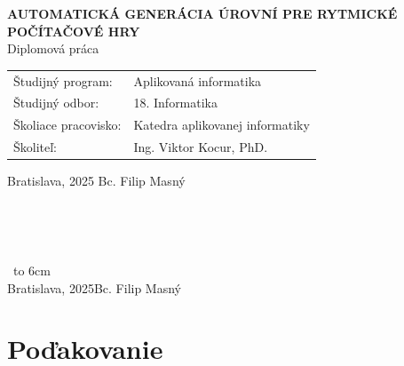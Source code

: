 \documentclass[12pt, oneside]{book}  %
\def\mftitle{Automatická Generácia Úrovní pre Rytmické Počítačové Hry}
\def\mfthesistype{Diplomová práca}
\def\mfauthor{Bc. Filip Masný}
\def\mfskolitel{Ing. Viktor Kocur, PhD.}
\def\mfplacedate{Bratislava, 2025}
\def\mfodbor{18. Informatika}
\def\program{Aplikovaná informatika}
\def\mfpracovisko{Katedra aplikovanej informatiky}
\begin{document}
\begin{center}
    \textbf{\MakeUppercase{\Large\mftitle}}\\
    \mfthesistype
\end{center}
\vfill


\begin{tabular}{l l}
    Študijný program:    & \program      \\
    Študijný odbor:      & \mfodbor      \\
    Školiace pracovisko: & \mfpracovisko \\
    Školiteľ:            & \mfskolitel   \\
\end{tabular}

\vfill
\noindent
\mfplacedate \hfill
\mfauthor
\cleardoublepage




\newpage
\thispagestyle{empty}

\newpage
\thispagestyle{empty}




{~}\vspace{12cm}

\noindent
\begin{minipage}{0.25\textwidth}~\end{minipage}
\thispagestyle{empty}
\begin{minipage}{0.75\textwidth}
    
\end{minipage}
\vfill
~\hfill {\hbox to 6cm{\dotfill}} \\
\mfplacedate \hfill \mfauthor
\vfill\eject \cleardoublepage




\newpage
\thispagestyle{empty}
\chapter*{Poďakovanie}\label{chap:thank_you}
\end{document}
